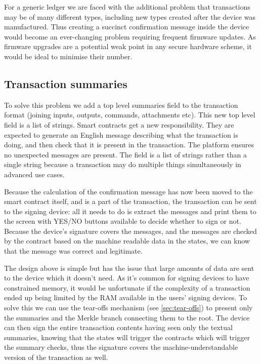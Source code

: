 \documentclass{article}
\begin{document}
For a generic ledger we are faced with the additional problem that transactions may be of many different types,
including new types created after the device was manufactured. Thus creating a succinct confirmation message inside the
device would become an ever-changing problem requiring frequent firmware updates. As firmware upgrades are a potential
weak point in any secure hardware scheme, it would be ideal to minimise their number.

\subsection{Transaction summaries}

To solve this problem we add a top level summaries field to the transaction format (joining inputs, outputs, commands,
attachments etc). This new top level field is a list of strings. Smart contracts get a new responsibility. They are
expected to generate an English message describing what the transaction is doing, and then check that it is present in
the transaction. The platform ensures no unexpected messages are present. The field is a list of strings rather than
a single string because a transaction may do multiple things simultaneously in advanced use cases.

Because the calculation of the confirmation message has now been moved to the smart contract itself, and is a part of
the transaction, the transaction can be sent to the signing device: all it needs to do is extract the messages and
print them to the screen with YES/NO buttons available to decide whether to sign or not. Because the device's signature
covers the messages, and the messages are checked by the contract based on the machine readable data in the states, we
can know that the message was correct and legitimate.

The design above is simple but has the issue that large amounts of data are sent to the device which it doesn't need.
As it's common for signing devices to have constrained memory, it would be unfortunate if the complexity of a transaction
ended up being limited by the RAM available in the users' signing devices. To solve this we can use the tear-offs
mechanism (see \cref{sec:tear-offs}) to present only the summaries and the Merkle branch connecting them to the root.
The device can then sign the entire transaction contents having seen only the textual summaries, knowing that the states
will trigger the contracts which will trigger the summary checks, thus the signature covers the machine-understandable
version of the transaction as well.
\end{document}
